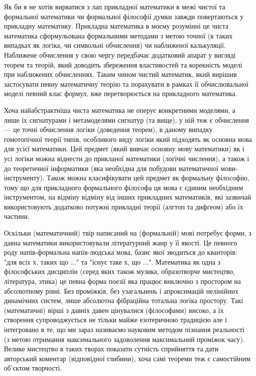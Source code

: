 Як би я не хотів вирватися з лап прикладної математики в межі
чистої та формальної математики чи формальної філософії думки
завжди повертаються у прикладну математику. Прикладна математика
в моєму розумінні це чиста математика сформульована формальними
методами з метою точної (в таких випадках як логіка, чи символьні
обчислення) чи наближеної калькуляції. Наближене обчислення у свою
чергу передбачає додатковий апарат у вигляді теорем та теорій,
який доводить збереження властивостей та корекність моделі при
наближених обчисленнях. Таким чином чистий математик, який вирішив
застосувати певну математичну теорію та порахувати в рамках її
обчислювальної моделі певний клас формул, вже перетворюється на
прикладного математика.

Хоча найабстрактніша чиста математика не оперує конкретними
моделями, а лише їх сигнатурами і метамоделями сигнатур (та вище),
у ній теж є обчислення --- це точні обчислення логіки (доведення
теорем), в даному випадку гомотопічної теорії типів, особливого
виду логіки який підходять як основна мова для усієї математики.
Цей предмет (який вивчає основну мову математики) як і усі логіки
можна віднести до прикланої математики (логічні числення), а також
і до теоретичної інформатики (яка необхідна для побудови
математичної мови-інструменту). Також можна класифікувати
цей предмет як формальну філософію, тому що для прикладного
формального філософа ця мова є єдиним необхідним інструментом,
на відміну відміну від інших прикладних математиків, які зазвичай
використовують додатково потужні прикладні теорії (алгтоп та
дифгеом) або їх частини.

Оскільки (математичний) твір написаний на (формальній) мові
потребує форми, з давна математики використовували літературний
жанр у її якості. Це певного роду напів-формальна напів-людська
мова, базис якої зводиться до кванторів: "для всіх х, таких що ..."
та "існує таке х, що ...". Математика як одна з філософських
дисциплін (серед яких також музика, образотворче мистецтво,
література, этика) це певна форма поезії яка працює виключно
з простором на абсолютному рівні. Без проміжків, без узагальнень
і апроксимацій нелінійних динамічних систем, лише абсолютна
фібраційна тотальна логіка простору. Такі (математичні) вірші
з давніх давен цінувалися (філософами) високо, а їх створення
супроводжується не тільки майже езотеричною традицією але і
інтегровано в те, що ми зараз називаємо науковим методом
пізнання реальності (з метою отримання максимального задоволення
максимальний проміжок часу). Велике мистецтво в таких творах
показати сутність сприйняття та дати авторський
коментар (відповідної глибини), хоча самі теореми
теж є самостійним об'єктом творчості.

